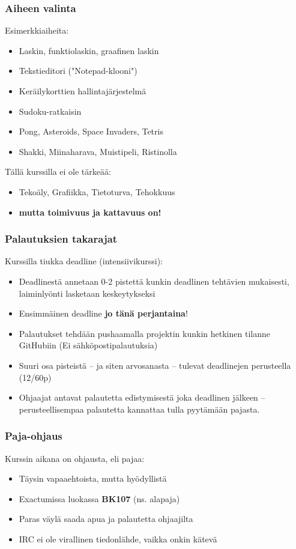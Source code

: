 \documentclass[finnish]{beamer}
\begin{document}
	\begin{frame}
		\frametitle{Aiheen valinta}
		
		Esimerkkiaiheita:
		\begin{itemize}
			\item Laskin, funktiolaskin, graafinen laskin
			\item Tekstieditori ("Notepad-klooni")
			\item Keräilykorttien hallintajärjestelmä
			\item Sudoku-ratkaisin
			\item Pong, Asteroids, Space Invaders, Tetris
			\item Shakki, Miinaharava, Muistipeli, Ristinolla
		\end{itemize}
		
		Tällä kurssilla ei ole tärkeää:
		\begin{itemize}
			\item Tekoäly, Grafiikka, Tietoturva, Tehokkuus
			\item \textbf{mutta toimivuus ja kattavuus on!}
		\end{itemize}
	\end{frame}
	
	\begin{frame}
		\frametitle{Palautuksien takarajat}

		Kurssilla tiukka deadline (intensiivikurssi):
		\begin{itemize}
			\item Deadlinestä annetaan 0-2 pistettä kunkin deadlinen tehtävien mukaisesti, laiminlyönti lasketaan keskeytykseksi
			\item Ensimmäinen deadline \textbf{jo tänä perjantaina}!
			\item Palautukset tehdään pushaamalla projektin kunkin hetkinen tilanne GitHubiin (Ei sähköpostipalautuksia)
			\item Suuri osa pisteistä -- ja siten arvosanasta -- tulevat deadlinejen perusteella (12/60p)
			\item Ohjaajat antavat palautetta edistymisestä joka deadlinen jälkeen -- perusteellisempaa palautetta kannattaa tulla pyytämään pajasta.
		\end{itemize}
	\end{frame}
	
	\begin{frame}
		\frametitle{Paja-ohjaus}

		Kurssin aikana on ohjausta, eli pajaa:
		\begin{itemize}
			\item Täysin vapaaehtoista, mutta hyödyllistä
			\item Exactumissa luokassa \textbf{BK107} (ns. alapaja)
			\item Paras väylä saada apua ja palautetta ohjaajilta
			\item IRC ei ole virallinen tiedonlähde, vaikka onkin kätevä
		\end{itemize}
	\end{frame}
	
\end{document}
